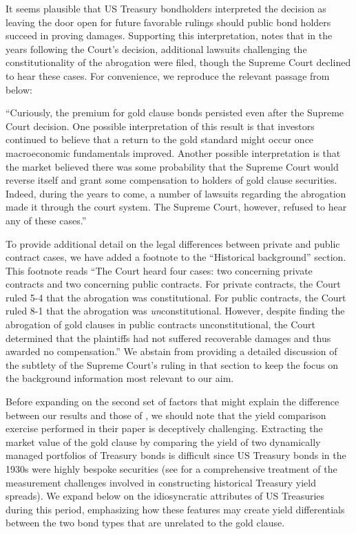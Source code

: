 It seems plausible that US Treasury bondholders interpreted the decision as leaving the door open for future favorable rulings should public bond holders succeed in proving damages. Supporting this interpretation, \cite{Edwards2015} notes that in the years following the Court's decision, additional lawsuits challenging the constitutionality of the abrogation were filed, though the Supreme Court declined to hear these cases. For convenience, we reproduce the relevant passage from \cite{Edwards2015} below:

``Curiously, the premium for gold clause bonds persisted even after the Supreme Court decision. One possible interpretation of this result is that investors continued to believe that a return to the gold standard might occur once macroeconomic fundamentals improved. Another possible interpretation is that the market believed there was some probability that the Supreme Court would reverse itself and grant some compensation to holders of gold clause securities. Indeed, during the years to come, a number of lawsuits regarding the abrogation made it through the court system. The Supreme Court, however, refused to hear any of these cases.''

To provide additional detail on the legal differences between private and public contract cases, we have added a footnote to the ``Historical background'' section. This footnote reads ``The Court heard four cases: two concerning private contracts and two concerning public contracts. For private contracts, the Court ruled 5-4 that the abrogation was constitutional. For public contracts, the Court ruled 8-1 that the abrogation was \textit{un}constitutional. However, despite finding the abrogation of gold clauses in public contracts unconstitutional, the Court determined that the plaintiffs had not suffered recoverable damages and thus awarded no compensation.'' We abstain from providing a detailed discussion of the subtlety of the Supreme Court's ruling in that section to keep the focus on the background information most relevant to our aim.

Before expanding on the second set of factors that might explain the difference between our results and those of \cite{Edwards2015}, we should note that the yield comparison exercise performed in their paper is deceptively challenging. Extracting the market value of the gold clause by comparing the yield of two dynamically managed portfolios of Treasury bonds is difficult since US Treasury bonds in the 1930s were highly bespoke securities (see \cite{Lehner2025} for a comprehensive treatment of the measurement challenges involved in constructing historical Treasury yield spreads). We expand below on the idiosyncratic attributes of US Treasuries during this period, emphasizing how these features may create yield differentials between the two bond types that are unrelated to the gold clause.

